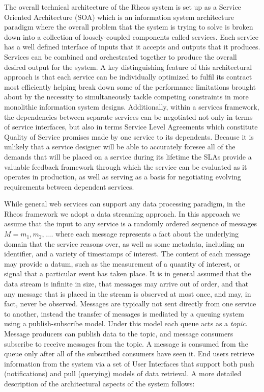 The overall technical architecture of the Rheos system is set up as a Service Oriented Architecture (SOA)\autocite{shaw1996software} which is an information system architecture paradigm where the overall problem that the system is trying to solve is broken down into a collection of loosely-coupled components called services. Each service has a well defined interface of inputs that it accepts and outputs that it produces. Services can be combined and orchestrated together to produce the overall desired output for the system. A key distinguishing feature of this architectural approach is that each service can be individually optimized to fulfil its contract most efficiently helping break down some of the performance limitations brought about by the necessity to simultaneously tackle competing constraints in more monolithic information system designs. Additionally, within a services framework, the dependencies between separate services can be negotiated not only in terms of service interfaces, but also in terms Service Level Agreements which constitute Quality of Service promises made by one service to its dependents\autocite{ingham2000constructing}. Because it is unlikely that a service designer will be able to accurately foresee all of the demands that will be placed on a service during its lifetime the SLAs provide a valuable feedback framework through which the service can be evaluated as it operates in production, as well as serving as a basis for negotiating evolving requirements between dependent services.

While general web services can support any data processing paradigm, in the Rheos framework we adopt a data streaming approach\autocite{babcock2002models}. In this approach we assume that the input to any service is a randomly ordered sequence of messages $M = {m_1, m_2, ....}$ where each message represents a fact about the underlying domain that the service reasons over, as well as some metadata, including an identifier, and a variety of timestamps of interest. The content of each message may provide a datum, such as the measurement of a quantity of interest, or signal that a particular event has taken place. It is in general assumed that the data stream is infinite in size, that messages may arrive out of order, and that any message that is placed in the stream is observed at most once, and may, in fact, never be observed. Messages are typically not sent directly from one service to another, instead the transfer of messages is mediated by a queuing system using a publish-subscribe\autocite{eugster2003many} model. Under this model each queue acts as a \emph{topic}. Message producers can publish data to the topic, and message consumers subscribe to receive messages from the topic. A message is consumed from the queue only after all of the subscribed consumers have seen it. End users retrieve information from the system via a set of User Interfaces that support both push (notifications) and pull (querying) models of data retrieval. A more detailed description of the architectural aspects of the system follows:

